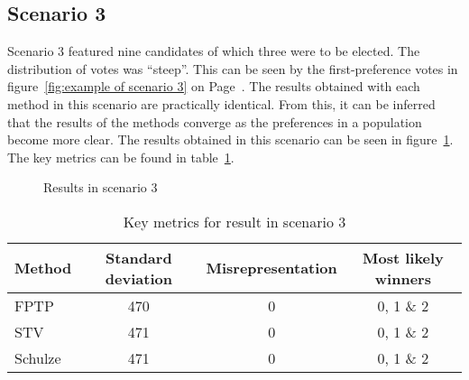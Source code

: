 \documentclass[12pt]{article}
\begin{document}
\subsection{Scenario 3}
\label{sec:resuls-scenario3}
Scenario 3 featured nine candidates of which three were to be elected. The distribution of votes was  ``steep''. This can be seen by the first-preference votes in figure~\ref{fig:example of scenario 3} on Page~\pageref{fig:example of scenario 3}. The results obtained with each method in this scenario are practically identical. From this, it can be inferred that the results of the methods converge as the preferences in a population become more clear. The results obtained in this scenario can be seen in figure~\ref{fig:scenario 3 result}. The key metrics can be found in table~\ref{tab:scenario 3 result}.
\begin{figure}[H]
	\centering
	\caption{Results in scenario 3}
\label{fig:scenario 3 result}
\end{figure}

\begin{table}[H]
	\centering
	\caption{Key metrics for result in scenario 3}
\label{tab:scenario 3 result}
	\begin{tabular}{@{}lccc@{}}
		\toprule
		Method & Standard deviation & Misrepresentation & Most likely winners \\ \midrule
		FPTP & 470 & 0 & 0, 1 \& 2 \\
		STV & 471 & 0 & 0, 1 \& 2 \\
		Schulze & 471 & 0 & 0, 1 \& 2  \\ \bottomrule
	\end{tabular}
\end{table}
\end{document}
